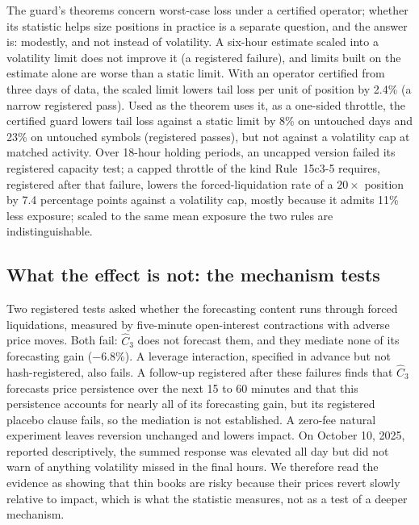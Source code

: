     The guard's theorems concern worst-case loss under a certified operator; whether its statistic helps size positions in practice is a separate question, and the answer is: modestly, and not instead of volatility. A six-hour estimate scaled into a volatility limit does not improve it (a registered failure), and limits built on the estimate alone are worse than a static limit. With an operator certified from three days of data, the scaled limit lowers tail loss per unit of position by 2.4\% (a narrow registered pass). Used as the theorem uses it, as a one-sided throttle, the certified guard lowers tail loss against a static limit by 8\% on untouched days and 23\% on untouched symbols (registered passes), but not against a volatility cap at matched activity. Over 18-hour holding periods, an uncapped version failed its registered capacity test; a capped throttle of the kind Rule~15c3-5 requires, registered after that failure, lowers the forced-liquidation rate of a $20\times$ position by 7.4 percentage points against a volatility cap, mostly because it admits 11\% less exposure; scaled to the same mean exposure the two rules are indistinguishable.\label{p2:sec:p24}

    \subsection{What the effect is not: the mechanism tests}\label{p2:sec:p22}

    Two registered tests asked whether the forecasting content runs through forced liquidations, measured by five-minute open-interest contractions with adverse price moves. Both fail: $\hat C_3$ does not forecast them, and they mediate none of its forecasting gain ($-6.8\%$). A leverage interaction, specified in advance but not hash-registered, also fails. A follow-up registered after these failures finds that $\hat C_3$ forecasts price persistence over the next 15 to 60 minutes and that this persistence accounts for nearly all of its forecasting gain, but its registered placebo clause fails, so the mediation is not established.\label{p2:sec:p25} A zero-fee natural experiment leaves reversion unchanged and lowers impact. On October 10, 2025, reported descriptively, the summed response was elevated all day but did not warn of anything volatility missed in the final hours. We therefore read the evidence as showing that thin books are risky because their prices revert slowly relative to impact, which is what the statistic measures, not as a test of a deeper mechanism.

